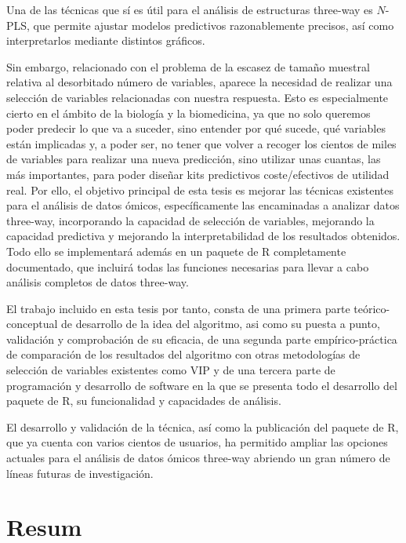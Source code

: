 Una de las técnicas que sí es útil para el análisis de estructuras three-way es $N$-PLS, que permite ajustar modelos predictivos razonablemente precisos, así como interpretarlos mediante distintos gráficos.

Sin embargo, relacionado con el problema de la escasez de tamaño muestral relativa al desorbitado número de variables, aparece la necesidad de realizar una selección de variables relacionadas con nuestra respuesta. Esto es especialmente cierto en el ámbito de la biología y la biomedicina, ya que no solo queremos poder predecir lo que va a suceder, sino entender por qué sucede, qué variables están implicadas y, a poder ser, no tener que volver a recoger los cientos de miles de variables para realizar una nueva predicción, sino utilizar unas cuantas, las más importantes, para poder diseñar kits predictivos coste/efectivos de utilidad real. Por ello, el objetivo principal de esta tesis es mejorar las técnicas existentes para el análisis de datos ómicos, específicamente las encaminadas a analizar datos three-way, incorporando la capacidad de selección de variables, mejorando la capacidad predictiva y mejorando la interpretabilidad de los resultados obtenidos. Todo ello se implementará además en un paquete de R completamente documentado, que incluirá todas las funciones necesarias para llevar a cabo análisis completos de datos three-way. 

El trabajo incluido en esta tesis por tanto, consta de una primera parte teórico-conceptual de desarrollo de la idea del algoritmo, asi como su puesta a punto, validación y comprobación de su eficacia, de una segunda parte empírico-práctica de comparación de los resultados del algoritmo con otras metodologías de selección de variables existentes como VIP y de una tercera parte de programación y desarrollo de software en la que se presenta todo el desarrollo del paquete de R, su funcionalidad y capacidades de análisis. 

El desarrollo y validación de la técnica, así como la publicación del paquete de R, que ya cuenta con varios cientos de usuarios, ha permitido ampliar las opciones actuales para el análisis de datos ómicos three-way  abriendo un gran número de líneas futuras de investigación.


\ifEBOOKPDF
	\bigskip
\else
	\vfill
\fi


\chapter*{Resum}

